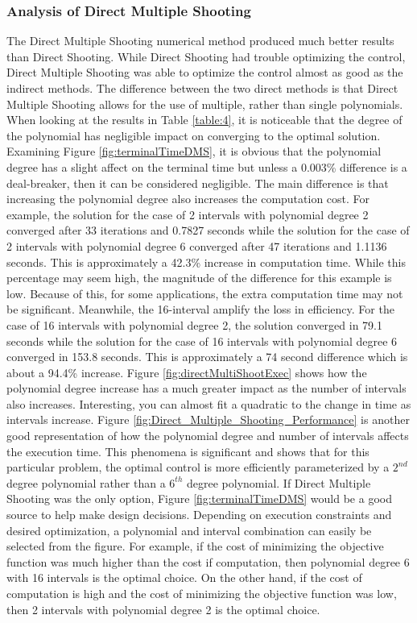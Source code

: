 \documentclass[]{article}
\begin{document}
\subsubsection{Analysis of Direct Multiple Shooting}
The Direct Multiple Shooting numerical method produced much better results than Direct Shooting. While Direct Shooting had trouble optimizing the control, Direct Multiple Shooting was able to optimize the control almost as good as the indirect methods. The difference between the two direct methods is that Direct Multiple Shooting allows for the use of multiple, rather than single polynomials. When looking at the results in Table \ref{table:4}, it is noticeable that the degree of the polynomial has negligible impact on converging to the optimal solution. Examining Figure \ref{fig:terminalTimeDMS}, it is obvious that the polynomial degree has a slight affect on the terminal time but unless a 0.003\% difference is a deal-breaker, then it can be considered negligible. The main difference is that increasing the polynomial degree also increases the computation cost. For example, the solution for the case of 2 intervals with polynomial degree 2 converged after 33 iterations and 0.7827 seconds while the solution for the case of 2 intervals with polynomial degree 6 converged after 47 iterations and 1.1136 seconds. This is approximately a 42.3\% increase in computation time. While this percentage may seem high, the magnitude of the difference for this example is low. Because of this, for some applications, the extra computation time may not be significant. Meanwhile, the 16-interval amplify the loss in efficiency. For the case of 16 intervals with polynomial degree 2, the solution converged in 79.1 seconds while the solution for the case of 16 intervals with polynomial degree 6 converged in 153.8 seconds. This is approximately a 74 second difference which is about a 94.4\% increase. Figure \ref{fig:directMultiShootExec} shows how the polynomial degree increase has a much greater impact as the number of intervals also increases. Interesting, you can almost fit a quadratic to the change in time as intervals increase. Figure \ref{fig:Direct_Multiple_Shooting_Performance} is another good representation of how the polynomial degree and number of intervals affects the execution time. This phenomena is significant and shows that for this particular problem, the optimal control is more efficiently parameterized by a \(2^{nd}\) degree polynomial rather than a \(6^{th}\) degree polynomial. If Direct Multiple Shooting was the only option, Figure \ref{fig:terminalTimeDMS} would be a good source to help make design decisions. Depending on execution constraints and desired optimization, a polynomial and interval combination can easily be selected from the figure. For example, if the cost of minimizing the objective function was much higher than the cost if computation, then polynomial degree 6 with 16 intervals is the optimal choice. On the other hand, if the cost of computation is high and the cost of minimizing the objective function was low, then 2 intervals with polynomial degree 2 is the optimal choice. 
\end{document}

